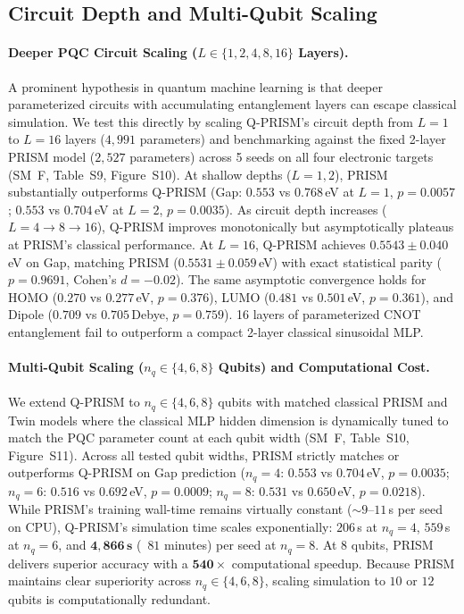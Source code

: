 \documentclass[10pt,twocolumn,letterpaper]{article}
\begin{document}
\subsection{Circuit Depth and Multi-Qubit Scaling}
\label{sec:depth_qubit_scaling}

\paragraph{Deeper PQC Circuit Scaling ($L \in \{1, 2, 4, 8, 16\}$ Layers).}
A prominent hypothesis in quantum machine learning is that deeper parameterized circuits with accumulating entanglement layers can escape classical simulation. We test this directly by scaling Q-PRISM's circuit depth from $L = 1$ to $L = 16$ layers ($4{,}991$ parameters) and benchmarking against the fixed 2-layer PRISM model ($2{,}527$ parameters) across 5 seeds on all four electronic targets (SM~F, Table~S9, Figure~S10).
At shallow depths ($L = 1, 2$), PRISM substantially outperforms Q-PRISM (Gap: $0.553$ vs $0.768$\,eV at $L=1$, $p = 0.0057$; $0.553$ vs $0.704$\,eV at $L=2$, $p = 0.0035$). As circuit depth increases ($L = 4 \to 8 \to 16$), Q-PRISM improves monotonically but asymptotically plateaus at PRISM's classical performance. At $L = 16$, Q-PRISM achieves $0.5543 \pm 0.040$\,eV on Gap, matching PRISM ($0.5531 \pm 0.059$\,eV) with exact statistical parity ($p = 0.9691$, Cohen's $d = -0.02$). The same asymptotic convergence holds for HOMO ($0.270$ vs $0.277$\,eV, $p = 0.376$), LUMO ($0.481$ vs $0.501$\,eV, $p = 0.361$), and Dipole ($0.709$ vs $0.705$\,Debye, $p = 0.759$). 16 layers of parameterized CNOT entanglement fail to outperform a compact 2-layer classical sinusoidal MLP.

\paragraph{Multi-Qubit Scaling ($n_q \in \{4, 6, 8\}$ Qubits) and Computational Cost.}
We extend Q-PRISM to $n_q \in \{4, 6, 8\}$ qubits with matched classical PRISM and Twin models where the classical MLP hidden dimension is dynamically tuned to match the PQC parameter count at each qubit width (SM~F, Table~S10, Figure~S11). Across all tested qubit widths, PRISM strictly matches or outperforms Q-PRISM on Gap prediction ($n_q = 4$: $0.553$ vs $0.704$\,eV, $p = 0.0035$; $n_q = 6$: $0.516$ vs $0.692$\,eV, $p = 0.0009$; $n_q = 8$: $0.531$ vs $0.650$\,eV, $p = 0.0218$).
While PRISM's training wall-time remains virtually constant ($\sim 9\text{--}11$\,s per seed on CPU), Q-PRISM's simulation time scales exponentially: $206$\,s at $n_q = 4$, $559$\,s at $n_q = 6$, and $\mathbf{4{,}866\,\text{s}}$ (~$81$ minutes) per seed at $n_q = 8$. At 8 qubits, PRISM delivers superior accuracy with a $\mathbf{540\times}$ computational speedup. Because PRISM maintains clear superiority across $n_q \in \{4, 6, 8\}$, scaling simulation to $10$ or $12$ qubits is computationally redundant.
\end{document}
